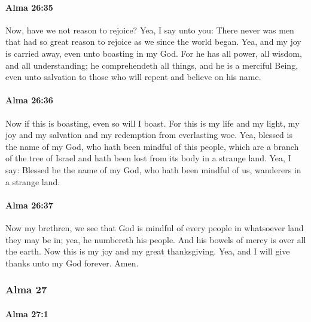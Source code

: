 		\paragraph{Alma 26:35} %
			\label{ALMA-26-35}

			Now, have we not reason to rejoice?
			Yea, I say unto you:
			There never was men that had so great reason to rejoice as we
			since the world began.
			Yea, and my joy is carried away, even unto boasting in my God.
			For he has all power, all wisdom, and all understanding;
			he comprehendeth all things, and he is a merciful Being,
			even unto salvation to those who will repent and believe on his name.

		\paragraph{Alma 26:36} %
			\label{ALMA-26-36}

			Now if this is boasting, even so will I boast.
			For this is my life and my light,
			my joy and my salvation and my redemption from everlasting woe.
			Yea, blessed is the name of my God,
			who hath been mindful of this people,
			which are a branch of the tree of Israel
			and hath been lost from its body in a strange land.
			Yea, I say:
			Blessed be the name of my God,
			who hath been mindful of us, wanderers in a strange land.

		\paragraph{Alma 26:37} %
			\label{ALMA-26-37}

			Now my brethren, we see that God is mindful of every people
			in whatsoever land they may be in;
			yea, he numbereth his people.
			And his bowels of mercy is over all the earth.
			Now this is my joy and my great thanksgiving.
			Yea, and I will give thanks unto my God forever.
			Amen.

	\subsubsection{Alma 27} %
		\label{ALMA-27}
		
		\paragraph{Alma 27:1} %
			\label{ALMA-27-1}

